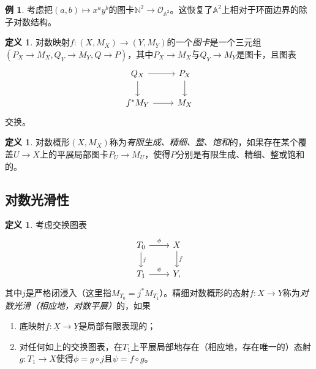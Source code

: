 \documentclass{amsart}
\theoremstyle{definition}
\newtheorem{defn}[thm]{定义}
\newtheorem{exm}[thm]{例}
\theoremstyle{remark}
\theoremstyle{plain}
\theoremstyle{definition}
\theoremstyle{remark}
\newcommand{\A}{\mathbb{A}}
\newcommand{\N}{\mathbb{N}}
\newcommand{\mc}[1]{\mathcal{#1}}
\newcommand{\ul}[1]{\underline{#1}}
\newcommand{\1}{\mathbf{1}}
\newcommand{\2}{\mathbf{2}}
\newcommand{\3}{\mathbf{3}}
\begin{document}
\begin{exm}
    考虑把\((a,b) \mapsto x^a y^b\)的图卡\(\N^2 \to \mc{O}_{\A^2}\)。这恢复了\(\A^2\)上相对于环面边界的除子对数结构。
\end{exm}

\begin{defn}
    对数映射\(f \colon (X, M_X) \to (Y, M_Y)\)的一个\textit{图卡}是一个三元组\((P_X\to M_X, Q_Y \to M_Y, Q \to P)\)，其中\(P_X \to M_X\)与\(Q_Y \to M_Y\)是图卡，且图表
    \begin{equation*}
    \begin{tikzcd}
        Q_X \ar{r} \ar{d} & P_X \ar{d} \\
        f^* M_Y \ar{r} & M_X
    \end{tikzcd}
    \end{equation*}
    交换。
\end{defn}

\begin{defn}
    对数概形\((X, M_X)\)称为\textit{有限生成、精细、整、饱和}的，如果存在某个覆盖\(U \to X\)上的平展局部图卡\(P_U \to M_U\)，使得\(P\)分别是有限生成、精细、整或饱和的。
\end{defn}

\subsection{对数光滑性}%
\label{sub:Log smoothness}

\begin{defn}
    考虑交换图表
    \begin{equation*}
    \begin{tikzcd}
        T_0 \ar{r}{\phi} \ar{d}{j} & X \ar{d}{f} \\
        T_1 \ar{r}{\psi} & Y,
    \end{tikzcd}
    \end{equation*}
    其中\(j\)是严格闭浸入（这里指\(M_{T_0} = j^* M_{T_1}\)）。精细对数概形的态射\(f \colon X \to Y\)称为\textit{对数光滑（相应地，对数平展）}的，如果
    \begin{enumerate}
        \item 底映射\(\ul{f} \colon \ul{X} \to \ul{Y}\)是局部有限表现的；
        \item 对任何如上的交换图表，在\(T_1\)上平展局部地存在（相应地，存在唯一的）态射\(g \colon T_1 \to X\)使得\(\phi = g \circ j\)且\(\psi = f \circ g\)。
    \end{enumerate}
\end{defn}
\end{document}

